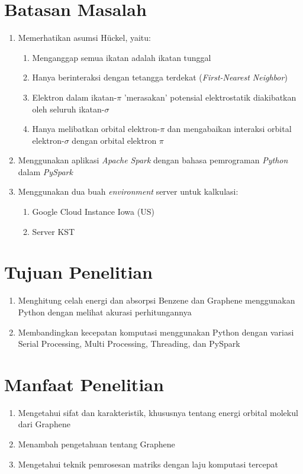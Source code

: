 \documentclass[12pt,a4paper]{report}
\begin{document}
	\section{Batasan Masalah}
	\begin{enumerate}
		\item Memerhatikan asumsi Hückel, yaitu:
		\begin{enumerate}
			\item Menganggap semua ikatan adalah ikatan tunggal
			\item Hanya berinteraksi dengan tetangga terdekat (\textit{First-Nearest Neighbor})
			\item Elektron dalam ikatan-$\pi$ 'merasakan' potensial elektrostatik diakibatkan oleh seluruh ikatan-$\sigma$
			\item Hanya melibatkan orbital elektron-$\pi$ dan mengabaikan interaksi orbital elektron-$\sigma$ dengan orbital elektron $\pi$
		\end{enumerate}
		\item Menggunakan aplikasi \textit{Apache Spark} dengan bahasa pemrograman \textit{Python} dalam \textit{PySpark}
		\item Menggunakan dua buah \textit{environment} server untuk kalkulasi:
		\begin{enumerate}
			\item Google Cloud Instance Iowa (US)
			\item Server KST
		\end{enumerate}
	\end{enumerate}

	\section{Tujuan Penelitian}
	\begin{enumerate}
		\item Menghitung celah energi dan absorpsi Benzene dan Graphene menggunakan Python dengan melihat akurasi perhitungannya
		\item Membandingkan kecepatan komputasi menggunakan Python dengan variasi Serial Processing, Multi Processing, Threading, dan PySpark
	\end{enumerate}

	\section{Manfaat Penelitian}
	\begin{enumerate}
		\item Mengetahui sifat dan karakteristik, khususnya tentang energi orbital molekul dari Graphene
		\item Menambah pengetahuan tentang Graphene
		\item Mengetahui teknik pemrosesan matriks dengan laju komputasi tercepat
	\end{enumerate}
\end{document}
